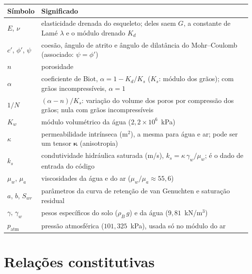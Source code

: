 \documentclass[11pt,a4paper]{article}
\newcommand{\tkap}{\bm\kappa}
\newcommand{\patm}{p_{\mathrm{atm}}}
\begin{document}
\begin{center}\small
\begin{minipage}{\textwidth}
\label{tab:parametros}
\begin{tabularx}{\textwidth}{@{}l X@{}}
\toprule
Símbolo & Significado\\
\midrule
$E$, $\nu$ & elasticidade drenada do esqueleto; deles saem $G$, a constante de Lamé
  $\lambda$ e o módulo drenado $K_d$\\
$c'$, $\phi'$, $\psi$ & coesão, ângulo de atrito e ângulo de dilatância do
  Mohr--Coulomb (associado: $\psi=\phi'$)\\
$n$ & porosidade\\
$\alpha$ & coeficiente de Biot, $\alpha=1-K_d/K_s$ ($K_s$: módulo dos grãos);
  com grãos incompressíveis, $\alpha=1$\\
$1/N$ & $(\alpha-n)/K_s$: variação do volume dos poros por compressão dos grãos;
  nula com grãos incompressíveis\\
$K_w$ & módulo volumétrico da água ($2{,}2\times10^{6}$~kPa)\\
$\kappa$ & permeabilidade intrínseca (m$^2$), a mesma para água e ar; pode ser um
  tensor $\tkap$ (anisotropia)\\
$k_s$ & condutividade hidráulica saturada (m/s), $k_s=\kappa\,\gamma_w/\mu_w$;
  é o dado de entrada do código\\
$\mu_w$, $\mu_a$ & viscosidades da água e do ar ($\mu_w/\mu_a\approx 55{,}6$)\\
$a$, $b$, $S_{wr}$ & parâmetros da curva de retenção de van Genuchten e saturação residual\\
$\gamma$, $\gamma_w$ & pesos específicos do solo ($\rho_B\,g$) e da água ($9{,}81$~kN/m$^3$)\\
$\patm$ & pressão atmosférica ($101{,}325$~kPa), usada só no módulo do ar\\
\bottomrule
\end{tabularx}
\end{minipage}
\end{center}

\section{Relações constitutivas}
\end{document}
